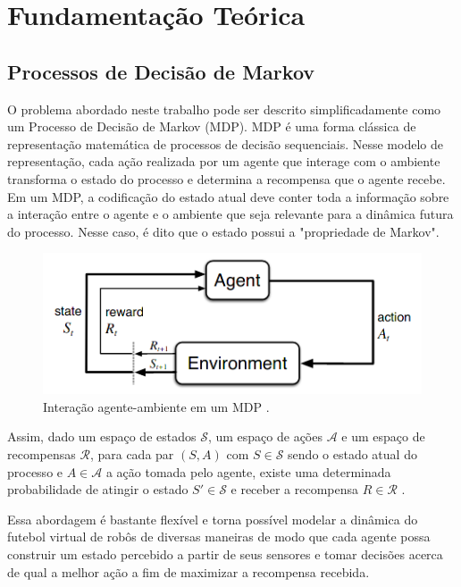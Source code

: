 \chapter{Fundamentação Teórica}
\label{chap:Fundamentacao}



\section{Processos de Decisão de Markov}

O problema abordado neste trabalho pode ser descrito simplificadamente como um Processo de Decisão de Markov (MDP).
MDP é uma forma clássica de representação matemática de processos de decisão sequenciais.
Nesse modelo de representação, cada ação realizada por um agente que interage com o ambiente transforma o estado do processo e determina a recompensa que o agente recebe.
Em um MDP, a codificação do estado atual deve conter toda a informação sobre a interação entre o agente e o ambiente que seja relevante para a dinâmica futura do processo. Nesse caso, é dito que o estado possui a "propriedade de Markov".

\begin{figure}[h]
	\includegraphics[width=0.6\linewidth]{figs/RL.png}
	\centering
	\caption{Interação agente-ambiente em um MDP \cite{sutton2018reinforcement}.} %
	\label{fig:mdp_env}
\end{figure}

Assim, dado um espaço de estados $\mathcal{S}$, um espaço de ações $\mathcal{A}$ e um espaço de recompensas $\mathcal{R}$, para cada par $(S, A)$ com $S \in \mathcal{S}$ sendo o estado atual do processo e $A \in \mathcal{A}$ a ação tomada pelo agente, existe uma determinada probabilidade de atingir o estado $S' \in \mathcal{S}$ e receber a recompensa $R \in \mathcal{R}$ \cite{sutton2018reinforcement}.

Essa abordagem é bastante flexível e torna possível modelar a dinâmica do futebol virtual de robôs de diversas maneiras de modo que cada agente possa construir um estado percebido a partir de seus sensores e tomar decisões acerca de qual a melhor ação a fim de maximizar a recompensa recebida.

